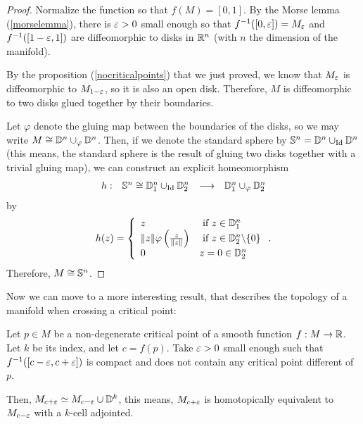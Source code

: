 \begin{proof}
Normalize the function so that $f(M) = [0,1]$. By the Morse lemma (\ref{morselemma}), there is $\varepsilon > 0$ small enough so that $f^{-1}([0,\varepsilon]) = M_{\varepsilon}$ and $f^{-1}([1-\varepsilon,1])$ are diffeomorphic to disks in $\mathbb{R}^n$ (with $n$ the dimension of the manifold).

By the proposition (\ref{nocriticalpoints}) that we just proved, we know that $M_{\varepsilon}$ is diffeomorphic to $M_{1-\varepsilon}$, so it is also an open disk. Therefore, $M$ is diffeomorphic to two disks glued together by their boundaries.

Let $\varphi$ denote the gluing map between the boundaries of the disks, so we may write $M \cong \mathbb{D}^n \cup_{\varphi} \mathbb{D}^n$. Then, if we denote the standard sphere by $\mathbb{S}^n = \mathbb{D}^n \cup_{\text{Id}} \mathbb{D}^n$ (this means, the standard sphere is the result of gluing two disks together with a trivial gluing map), we can construct an explicit homeomorphism
\[\begin{array}{rccc} h : & \mathbb{S}^n \cong \mathbb{D}_1^n \cup_{\text{Id}} \mathbb{D}_2^n & \longrightarrow & \mathbb{D}_1^n \cup_{\varphi} \mathbb{D}_2^n \end{array}\]
by
\[h(z) = \left\{ \begin{array}{ll} z & \text{ if } z \in \mathbb{D}_1^n \\ \|z\| \varphi\left( \frac{z}{\|z\|} \right) & \text{ if } z \in \mathbb{D}_2^n \backslash \{0\} \\ 0 & z = 0 \in \mathbb{D}_2^n \end{array} \right. .\]
Therefore, $M \cong \mathbb{S}^n$.
\end{proof}

Now we can move to a more interesting result, that describes the topology of a manifold when crossing a critical point:

\begin{theo}
Let $p \in M$ be a non-degenerate critical point of a smooth function $f : M \rightarrow \mathbb{R}$. Let $k$ be its index, and let $c = f(p)$. Take $\varepsilon > 0$ small enough such that $f^{-1}([c-\varepsilon,c+\varepsilon])$ is compact and does not contain any critical point different of $p$.

Then, $M_{c+\varepsilon} \simeq M_{c-\varepsilon} \cup \mathbb{D}^k$, this means, $M_{c+\varepsilon}$ is homotopically equivalent to $M_{c-\varepsilon}$ with a $k$-cell adjointed.
\end{theo}

